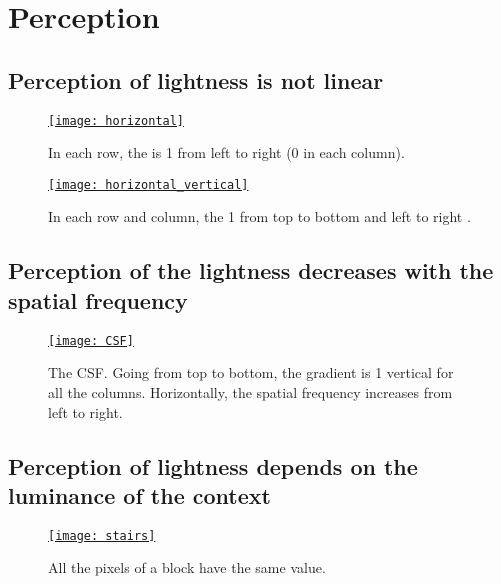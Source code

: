 \chapter{Perception}

\section{Perception of lightness \cite{wikipedia_lightness} is not linear}
\begin{figure}[H]
  \centering
  \href{https://github.com/vicente-gonzalez-ruiz/medical_imaging/blob/main/notebooks/horizontal_vertical.ipynb}{\texttt{[image: horizontal]}}
  \caption[Perception of lightness (brightness) is not linear (1).]{In each row, the  is 1 from left to right (0 in each column).}
  \label{fig:HVS_no_linear}
\end{figure}

\begin{figure}[H]
  \centering
  \href{https://github.com/vicente-gonzalez-ruiz/medical_imaging/blob/main/notebooks/horizontal_vertical.ipynb}{\texttt{[image: horizontal\_vertical]}}
  \caption[Perception of lightness is not linear (2).]{In each row and column, the  1 from top to bottom and left to right .}
  \label{fig:HVS_no_linear}
\end{figure}

\section{Perception of the lightness decreases with the spatial frequency}
\begin{figure}[H]
  \centering
  \href{https://github.com/vicente-gonzalez-ruiz/medical_imaging/blob/main/notebooks/CSF.ipynb}{\texttt{[image: CSF]}}
  \caption[Lightness VS spatial frequency (the \gls{CSF}).]{The
    \gls{CSF}. Going from top to bottom, the gradient is 1 vertical
    for all the columns. Horizontally, the spatial frequency increases
    from left to right.}
  \label{fig:CSF}
\end{figure}

\section{Perception of lightness depends on the luminance of the context}
\begin{figure}[H]
  \centering
  \href{https://github.com/vicente-gonzalez-ruiz/medical_imaging/blob/main/notebooks/stairs.ipynb}{\texttt{[image: stairs]}}
  \caption[Lightness VS surrounding luminance (1).]{All the pixels of a block have the same value.}
  \label{fig:stairs}
\end{figure}

